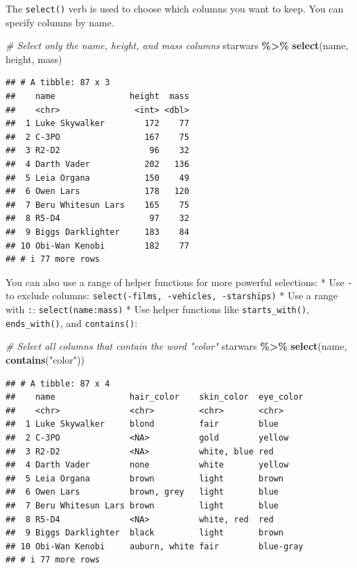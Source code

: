\documentclass[
  11pt,
]{article}
\newenvironment{Shaded}{\begin{snugshade}}{\end{snugshade}}
\newcommand{\CommentTok}[1]{\textcolor[rgb]{0.56,0.35,0.01}{\textit{#1}}}
\newcommand{\FunctionTok}[1]{\textcolor[rgb]{0.13,0.29,0.53}{\textbf{#1}}}
\newcommand{\NormalTok}[1]{#1}
\newcommand{\SpecialCharTok}[1]{\textcolor[rgb]{0.81,0.36,0.00}{\textbf{#1}}}
\newcommand{\StringTok}[1]{\textcolor[rgb]{0.31,0.60,0.02}{#1}}
\begin{document}
The \texttt{select()} verb is used to choose which columns you want to
keep. You can specify columns by name.

\begin{Shaded}
\begin{Highlighting}[]
\CommentTok{\# Select only the name, height, and mass columns}
\NormalTok{starwars }\SpecialCharTok{\%\textgreater{}\%} 
  \FunctionTok{select}\NormalTok{(name, height, mass)}
\end{Highlighting}
\end{Shaded}

\begin{verbatim}
## # A tibble: 87 x 3
##    name               height  mass
##    <chr>               <int> <dbl>
##  1 Luke Skywalker        172    77
##  2 C-3PO                 167    75
##  3 R2-D2                  96    32
##  4 Darth Vader           202   136
##  5 Leia Organa           150    49
##  6 Owen Lars             178   120
##  7 Beru Whitesun Lars    165    75
##  8 R5-D4                  97    32
##  9 Biggs Darklighter     183    84
## 10 Obi-Wan Kenobi        182    77
## # i 77 more rows
\end{verbatim}

You can also use a range of helper functions for more powerful
selections: * Use \texttt{-} to exclude columns:
\texttt{select(-films,\ -vehicles,\ -starships)} * Use a range with
\texttt{:}: \texttt{select(name:mass)} * Use helper functions like
\texttt{starts\_with()}, \texttt{ends\_with()}, and \texttt{contains()}:

\begin{Shaded}
\begin{Highlighting}[]
\CommentTok{\# Select all columns that contain the word "color"}
\NormalTok{starwars }\SpecialCharTok{\%\textgreater{}\%} 
  \FunctionTok{select}\NormalTok{(name, }\FunctionTok{contains}\NormalTok{(}\StringTok{"color"}\NormalTok{))}
\end{Highlighting}
\end{Shaded}

\begin{verbatim}
## # A tibble: 87 x 4
##    name               hair_color    skin_color  eye_color
##    <chr>              <chr>         <chr>       <chr>    
##  1 Luke Skywalker     blond         fair        blue     
##  2 C-3PO              <NA>          gold        yellow   
##  3 R2-D2              <NA>          white, blue red      
##  4 Darth Vader        none          white       yellow   
##  5 Leia Organa        brown         light       brown    
##  6 Owen Lars          brown, grey   light       blue     
##  7 Beru Whitesun Lars brown         light       blue     
##  8 R5-D4              <NA>          white, red  red      
##  9 Biggs Darklighter  black         light       brown    
## 10 Obi-Wan Kenobi     auburn, white fair        blue-gray
## # i 77 more rows
\end{verbatim}
\end{document}
